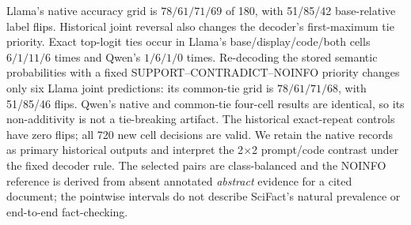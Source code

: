 Llama's native accuracy grid is $78/61/71/69$ of 180, with 51/85/42
base-relative label flips. Historical joint reversal also changes the
decoder's first-maximum tie priority. Exact top-logit ties occur in
Llama's base/display/code/both cells $6/1/11/6$ times and Qwen's
$1/6/1/0$ times. Re-decoding the stored semantic probabilities with a
fixed SUPPORT--CONTRADICT--NOINFO priority changes only six Llama joint
predictions: its common-tie grid is $78/61/71/68$, with 51/85/46 flips.
Qwen's native and common-tie four-cell results are identical, so its
non-additivity is not a tie-breaking artifact. The historical exact-repeat
controls have zero flips; all 720 new cell decisions are valid. We retain
the native records as primary historical outputs and interpret the 2$\times$2
prompt/code contrast under the fixed decoder rule. The selected pairs are
class-balanced and the NOINFO reference is derived from absent annotated
\emph{abstract} evidence for a cited document; the pointwise intervals do
not describe SciFact's natural prevalence or end-to-end fact-checking.
\FloatBarrier
